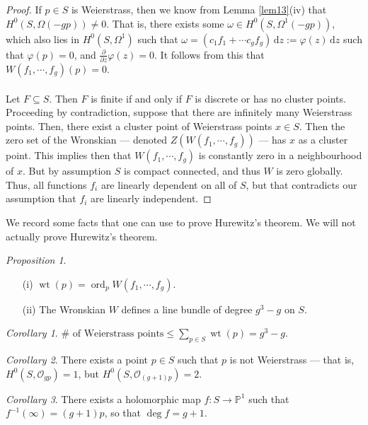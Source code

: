 \documentclass[a4paper]{report}
\theoremstyle{definition}
\theoremstyle{remark}
\theoremstyle{proposition}
\newtheorem{proposition}{Proposition}
\theoremstyle{conjecture}
\theoremstyle{lemma}
\theoremstyle{corollary}
\newtheorem{corollary}{Corollary}
\theoremstyle{exercise}
\theoremstyle{example}
\newcommand{\mcal}{\mathcal}
\newcommand{\diff}{\,\mathrm{d}}
\newcommand{\on}{\operatorname}
\begin{document}
\begin{proof}
    If $p \in S$ is Weierstrass, then we know from Lemma \ref{lem13}(iv) 
    that $H^0(S,\Omega(-gp)) \neq 0$. That is, there exists some 
    $\omega \in H^0(S,\Omega^1(-gp))$, which also lies 
    in $H^0(S,\Omega^1)$ such that $\omega = (c_1f_1 + \cdots c_gf_g)\diff z :=\varphi(z) \diff z$
    such that $\varphi(p) = 0$, and $\frac{\partial}{\partial z}\varphi(z)=0$.
    It follows from this that $W(f_1,\cdots,f_g)(p) = 0$.\\\\
    Let $F\subseteq S$. Then $F$ is finite if and only if $F$ is discrete 
    or has no cluster points. Proceeding by contradiction, suppose that there 
    are infinitely many Weierstrass points. Then, there exist a cluster
    point of Weierstrass points $x \in S$. Then the zero set of the 
    Wronskian --- denoted $Z(W(f_1,\cdots,f_g))$ --- has $x$ as a cluster
    point. This implies then that $W(f_1,\cdots,f_g)$ is constantly zero in a 
    neighbourhood of $x$. But by assumption $S$ is compact connected, and thus 
    $W$ is zero globally. Thus, all functions $f_i$ are linearly dependent on
    all of $S$, but that contradicts our assumption that $f_i$ are linearly
    independent.
\end{proof}

We record some facts that one can use to prove Hurewitz's theorem. 
We will not actually prove Hurewitz's theorem.
\begin{proposition}
    \leavevmode
    \begin{itemize}
        \item[(i)] $\on{wt}(p) = \on{ord}_pW(f_1,\cdots,f_g)$.
        \item[(ii)] The Wronskian $W$ defines a line bundle of degree $g^3-g$
            on $S$.
    \end{itemize}
\end{proposition}

\begin{corollary}
    $\text{$\#$ of Weierstrass points} \leq \sum_{p\in S} \on{wt}(p) = g^3-g$.
\end{corollary}

\begin{corollary}
    There exists a point $p\in S$ such that $p$ is not Weierstrass --- 
    that is, $H^0(S,\mcal{O}_{gp}) = 1$, but 
    $H^0(S,\mcal{O}_{(g+1)p}) = 2$.
\end{corollary}

\begin{corollary}
    There exists a holomorphic map $f : S \to \mathbb{P}^1$ such that 
    $f^{-1}(\infty) = (g+1)p$, so that $\deg f = g +1$.
\end{corollary}
\end{document}
